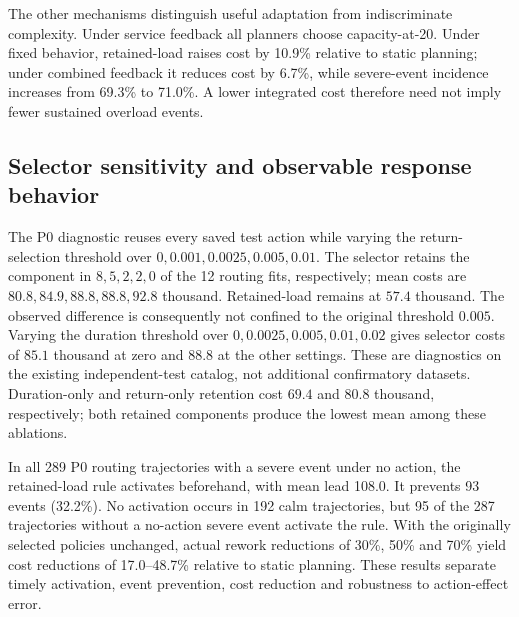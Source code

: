 The other mechanisms distinguish useful adaptation from indiscriminate complexity. Under service feedback all planners choose capacity-at-20. Under fixed behavior, retained-load raises cost by 10.9\% relative to static planning; under combined feedback it reduces cost by 6.7\%, while severe-event incidence increases from 69.3\% to 71.0\%. A lower integrated cost therefore need not imply fewer sustained overload events.

\subsection{Selector sensitivity and observable response behavior}
The P0 diagnostic reuses every saved test action while varying the return-selection threshold over $0,0.001,0.0025,0.005,0.01$. The selector retains the component in $8,5,2,2,0$ of the 12 routing fits, respectively; mean costs are $80.8,84.9,88.8,88.8,92.8$ thousand. Retained-load remains at $57.4$ thousand. The observed difference is consequently not confined to the original threshold $0.005$. Varying the duration threshold over $0,0.0025,0.005,0.01,0.02$ gives selector costs of $85.1$ thousand at zero and $88.8$ at the other settings. These are diagnostics on the existing independent-test catalog, not additional confirmatory datasets. Duration-only and return-only retention cost $69.4$ and $80.8$ thousand, respectively; both retained components produce the lowest mean among these ablations.

In all 289 P0 routing trajectories with a severe event under no action, the retained-load rule activates beforehand, with mean lead 108.0. It prevents 93 events (32.2\%). No activation occurs in 192 calm trajectories, but 95 of the 287 trajectories without a no-action severe event activate the rule. With the originally selected policies unchanged, actual rework reductions of 30\%, 50\% and 70\% yield cost reductions of 17.0--48.7\% relative to static planning. These results separate timely activation, event prevention, cost reduction and robustness to action-effect error.


